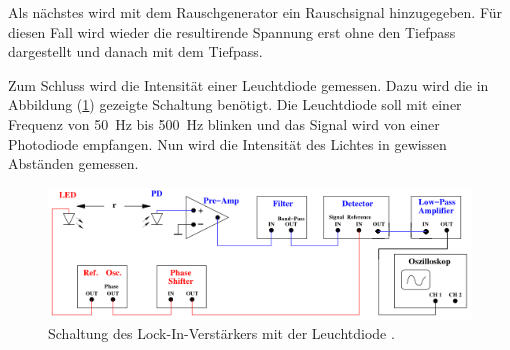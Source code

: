 Als nächstes wird mit dem Rauschgenerator ein Rauschsignal hinzugegeben. Für diesen
Fall wird wieder die resultirende Spannung erst ohne den Tiefpass dargestellt und
danach mit dem Tiefpass.

Zum Schluss wird die Intensität einer Leuchtdiode gemessen. Dazu wird die in Abbildung
(\ref{abb:4}) gezeigte Schaltung benötigt. Die Leuchtdiode soll mit einer Frequenz
von \SI{50}{\hertz} bis \SI{500}{\hertz} blinken und das Signal wird von einer Photodiode empfangen.
Nun wird die Intensität des Lichtes in gewissen Abständen gemessen.

\begin{figure}[H]
  \centering
  \includegraphics{Schaltung2.png}
  \caption{Schaltung des Lock-In-Verstärkers mit der Leuchtdiode \cite{1}.}
  \label{abb:4}
\end{figure}
